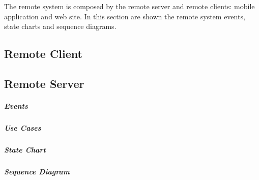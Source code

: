 
The remote system is composed by the remote server and remote clients: mobile application and web site. In this section are shown the remote system events, state charts and sequence diagrams.

\subsection{Remote Client}



\clearpage
\subsection{Remote Server}
\subparagraph*{Events}

\subparagraph*{Use Cases}

\subparagraph*{State Chart}

\subparagraph*{Sequence Diagram}


%
%
%
%
%
%
%
%
%
%
%
%
%
%
%
%
%
%
%

